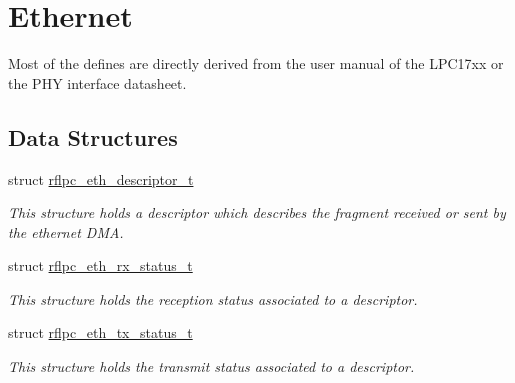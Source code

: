 \hypertarget{group__eth}{\section{Ethernet}
\label{group__eth}
}


Most of the defines are directly derived from the user manual of the L\-P\-C17xx or the P\-H\-Y interface datasheet.  


\subsection*{Data Structures}
\begin{DoxyCompactItemize}
\item 
struct \hyperlink{structrflpc__eth__descriptor__t}{rflpc\-\_\-eth\-\_\-descriptor\-\_\-t}
\begin{DoxyCompactList}\small\item\em This structure holds a descriptor which describes the fragment received or sent by the ethernet D\-M\-A. \end{DoxyCompactList}\item 
struct \hyperlink{structrflpc__eth__rx__status__t}{rflpc\-\_\-eth\-\_\-rx\-\_\-status\-\_\-t}
\begin{DoxyCompactList}\small\item\em This structure holds the reception status associated to a descriptor. \end{DoxyCompactList}\item 
struct \hyperlink{structrflpc__eth__tx__status__t}{rflpc\-\_\-eth\-\_\-tx\-\_\-status\-\_\-t}
\begin{DoxyCompactList}\small\item\em This structure holds the transmit status associated to a descriptor. \end{DoxyCompactList}\end{DoxyCompactItemize}
